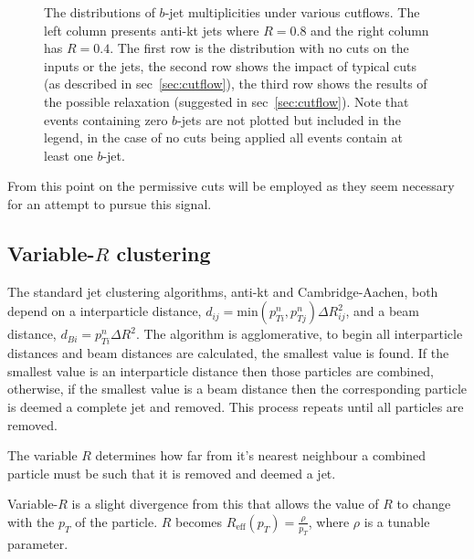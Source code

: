 \begin{figure}[t!]
	\caption{The distributions of $b$-jet multiplicities under various cutflows.
        The left column presents anti-kt jets where \(R=0.8\) and the right column has \(R=0.4\).
        The first row is the distribution with no cuts on the inputs or the jets,
        the second row shows the impact of typical cuts (as described in sec~\ref{sec:cutflow}),
        the third row shows the results of the possible relaxation (suggested in sec~\ref{sec:cutflow}).
        Note that events containing zero $b$-jets are not plotted but included in the legend, in the case of no cuts being applied all events contain at least one $b$-jet.}
\label{fig:nbjets}
\end{figure}

From this point on the permissive cuts will be employed as they seem necessary
for an attempt to pursue this signal.

\subsection{Variable-$R$ clustering}
The standard jet clustering algorithms, anti-kt and Cambridge-Aachen,
both depend on a interparticle distance,
\( d_{ij} = \text{min}(p^n_{Ti}, p^n_{Tj})\Delta R^2_{ij}\), 
and a beam distance,
\( d_{Bi} = p^n_{Ti}\Delta R^2\).
The algorithm is agglomerative, to begin 
all interparticle distances and beam distances are calculated,
the smallest value is found.
If the smallest value is an interparticle distance 
then those particles are combined,
otherwise, if the smallest value is a beam distance
then the corresponding particle is deemed a complete jet and removed.
This process repeats until all particles are removed.

The variable \(R\) determines how far from it's nearest neighbour
a combined particle must be such that it is removed and deemed a jet.

Variable-\(R\) is a slight divergence from this that allows the
value of \(R\) to change with the \(p_T\) of the particle.
\(R\) becomes \(R_\text{eff}(p_T) = \frac{\rho}{p_T}\), where \(\rho\)
is a tunable parameter.

